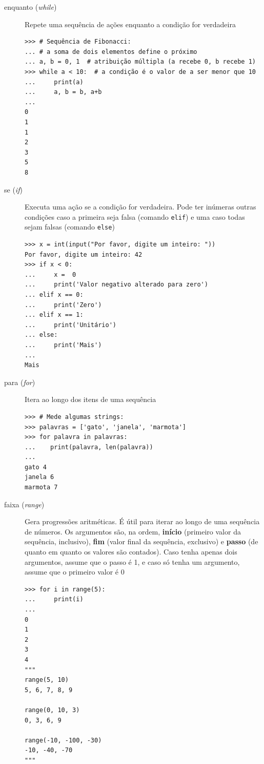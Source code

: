\begin{description}
	\item[enquanto (\textit{while})] Repete uma sequência de ações enquanto a condição for verdadeira
	\begin{verbatim}
>>> # Sequência de Fibonacci:
... # a soma de dois elementos define o próximo
... a, b = 0, 1  # atribuição múltipla (a recebe 0, b recebe 1)
>>> while a < 10:  # a condição é o valor de a ser menor que 10
...     print(a)
...     a, b = b, a+b
...
0
1
1
2
3
5
8
	\end{verbatim}
	\item[se (\textit{if})] Executa uma ação se a condição for verdadeira. Pode ter inúmeras outras condições caso a primeira seja falsa (comando \verb|elif|) e uma caso todas sejam falsas (comando \verb|else|)
	\begin{verbatim}
>>> x = int(input("Por favor, digite um inteiro: "))
Por favor, digite um inteiro: 42
>>> if x < 0:
...     x =  0
...     print('Valor negativo alterado para zero')
... elif x == 0:
...     print('Zero')
... elif x == 1:
...     print('Unitário')
... else:
...     print('Mais')
... 
Mais
	\end{verbatim}
	\item[para (\textit{for})] Itera ao longo dos itens de uma sequência
	\begin{verbatim}
>>> # Mede algumas strings:
>>> palavras = ['gato', 'janela', 'marmota']
>>> for palavra in palavras:
...    print(palavra, len(palavra))
... 
gato 4
janela 6
marmota 7
	\end{verbatim}
	\item[faixa (\textit{range})] Gera progressões aritméticas. É útil para iterar ao longo de uma sequência de números. Os argumentos são, na ordem, \textbf{início} (primeiro valor da sequência, inclusivo), \textbf{fim} (valor final da sequência, exclusivo) e \textbf{passo} (de quanto em quanto os valores são contados). Caso tenha apenas dois argumentos, assume que o passo é 1, e caso só tenha um argumento, assume que o primeiro valor é 0
	\begin{verbatim}
>>> for i in range(5):
...     print(i)
...
0
1
2
3
4
"""
range(5, 10)
5, 6, 7, 8, 9

range(0, 10, 3)
0, 3, 6, 9

range(-10, -100, -30)
-10, -40, -70
"""
	\end{verbatim}
\end{description}

